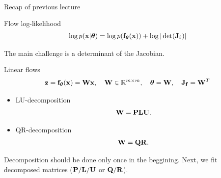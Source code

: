 \begin{frame}{Recap of previous lecture}
	\vspace{-0.5cm}
	\begin{block}{Flow log-likelihood}
		\vspace{-0.3cm}
		\[
			\log p(\mathbf{x}|\boldsymbol{\theta}) = \log p(\mathbf{f}_{\boldsymbol{\theta}}(\mathbf{x})) + \log  |\det (\mathbf{J}_{\mathbf{f}})|
		\]
		\vspace{-0.5cm}
	\end{block}
	The main challenge is a determinant of the Jacobian.
	\begin{block}{Linear flows}	
		\vspace{-0.2cm}
		\[
			\mathbf{z} = \mathbf{f}_{\boldsymbol{\theta}}(\mathbf{x}) = \mathbf{W} \mathbf{x}, \quad \mathbf{W} \in \mathbb{R}^{m \times m}, \quad \boldsymbol{\theta} = \mathbf{W}, \quad \mathbf{J}_{\mathbf{f}} = \mathbf{W}^T
		\]
	\end{block}
	\vspace{-0.3cm}
	\begin{itemize}
		\item LU-decomposition
		\[
			\mathbf{W} = \mathbf{P} \mathbf{L} \mathbf{U}.
		\]
		\item QR-decomposition
		\[
			\mathbf{W} = \mathbf{Q} \mathbf{R}.
		\]
	\end{itemize}
	Decomposition should be done only once in the beggining. Next, we fit decomposed matrices ($\mathbf{P}/\mathbf{L}/\mathbf{U}$ or $\mathbf{Q}/\mathbf{R}$).
\end{frame}
